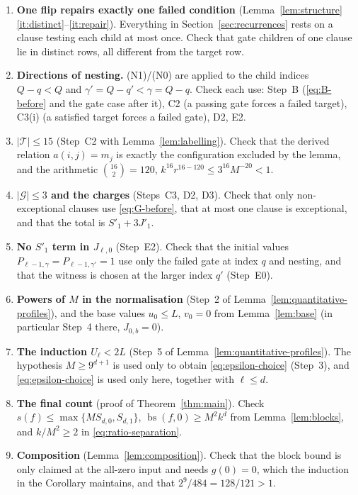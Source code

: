 \documentclass[11pt]{article}
\newcommand{\bs}{\operatorname{bs}}
\theoremstyle{definition}
\theoremstyle{remark}
\begin{document}
\begin{enumerate}[leftmargin=2em]
\item \textbf{One flip repairs exactly one failed condition}
 (Lemma~\ref{lem:structure}\ref{it:distinct}--\ref{it:repair}). Everything
 in Section~\ref{sec:recurrences} rests on a clause testing each child at
 most once. Check that gate children of one clause lie in distinct rows,
 all different from the target row.
\item \textbf{Directions of nesting.} (N1)/(N0) are applied to the child
 indices \(Q-q<Q\) and \(\gamma'=Q-q'<\gamma=Q-q\). Check each use: Step~B
 (\eqref{eq:B-before} and the gate case after it), C2 (a passing gate
 forces a failed target), C3(i) (a satisfied target forces a failed gate),
 D2, E2.
\item \textbf{\(|\mathcal T|\le15\)} (Step~C2 with
 Lemma~\ref{lem:labelling}). Check that the derived relation
 \(a(i,j)=m_j\) is exactly the configuration excluded by the lemma, and
 the arithmetic \(\binom{16}{2}=120\), \(k^{16}r^{16-120}\le3^{16}M^{-20}<1\).
\item \textbf{\(|\mathcal G|\le3\) and the charges} (Steps~C3, D2, D3). Check
 that only non-exceptional clauses use \eqref{eq:G-before}, that at most
 one clause is exceptional, and that the total is \(S'_1+3J'_1\).
\item \textbf{No \(S'_1\) term in \(J_{\ell,0}\)} (Step~E2). Check that the
 initial values \(P_{\ell-1,\gamma}=P_{\ell-1,\gamma'}=1\) use only the
 failed gate at index \(q\) and nesting, and that the witness is chosen at
 the larger index \(q'\) (Step~E0).
\item \textbf{Powers of \(M\) in the normalisation} (Step~2 of
 Lemma~\ref{lem:quantitative-profiles}), and the base values
 \(u_0\le L\), \(v_0=0\) from Lemma~\ref{lem:base} (in particular Step~4
 there, \(J_{0,b}=0\)).
\item \textbf{The induction \(U_\ell<2L\)} (Step~5 of
 Lemma~\ref{lem:quantitative-profiles}). The hypothesis \(M\ge9^{d+1}\) is
 used only to obtain \eqref{eq:epsilon-choice} (Step~3), and
 \eqref{eq:epsilon-choice} is used only here, together with \(\ell\le d\).
\item \textbf{The final count} (proof of Theorem~\ref{thm:main}). Check
 \(s(f)\le\max\{MS_{d,0},S_{d,1}\}\), \(\bs(f,0)\ge M^2k^d\) from
 Lemma~\ref{lem:blocks}, and \(k/M^2\ge2\) in
 \eqref{eq:ratio-separation}.
\item \textbf{Composition} (Lemma~\ref{lem:composition}). Check that the
 block bound is only claimed at the all-zero input and needs \(g(0)=0\),
 which the induction in the Corollary maintains, and that
 \(2^9/484=128/121>1\).
\end{enumerate}



\end{document}
